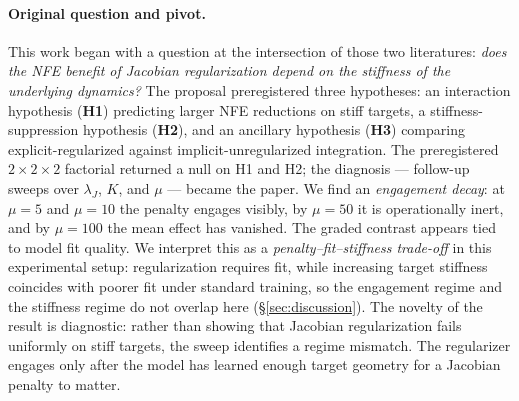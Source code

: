 \documentclass[11pt]{article}
\theoremstyle{plain}
\theoremstyle{definition}
\begin{document}
\paragraph{Original question and pivot.}
This work began with a question at the intersection of those two literatures:
\emph{does the NFE benefit of Jacobian regularization depend on the stiffness
of the underlying dynamics?} The proposal preregistered three hypotheses: an
interaction hypothesis (\textbf{H1}) predicting larger NFE reductions on
stiff targets, a stiffness-suppression hypothesis (\textbf{H2}), and an
ancillary hypothesis (\textbf{H3}) comparing explicit-regularized against
implicit-unregularized integration. The preregistered $2{\times}2{\times}2$
factorial returned a null on H1 and H2; the diagnosis --- follow-up
sweeps over $\lambda_J$, $K$, and $\mu$ --- became the paper. We find an
\emph{engagement decay}: at $\mu = 5$ and $\mu = 10$ the penalty engages
visibly, by $\mu = 50$ it is operationally inert, and by $\mu = 100$ the mean
effect has vanished. The graded contrast appears tied to model fit quality.
We interpret this as a \emph{penalty--fit--stiffness trade-off} in this
experimental setup: regularization requires fit, while increasing target
stiffness coincides with poorer fit under standard training, so the engagement
regime and the stiffness regime do not overlap here
(\S\ref{sec:discussion}).
The novelty of the result is diagnostic: rather than showing that Jacobian
regularization fails uniformly on stiff targets, the sweep identifies a regime
mismatch. The regularizer engages only after the model has learned enough
target geometry for a Jacobian penalty to matter.
\end{document}
